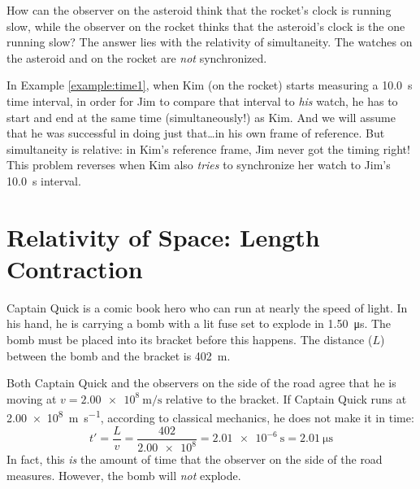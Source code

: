 How can the observer on the asteroid think that the rocket's clock is running
slow, while the observer on the rocket thinks that the asteroid's clock is
the one running slow? The answer lies with the relativity of simultaneity. The
watches on the asteroid and on the rocket are \emph{not} synchronized.

In Example \ref{example:time1}, when Kim (on the rocket) starts measuring a
\SI{10.0}{\second} time interval, in order for Jim to compare that interval to
\emph{his} watch, he has to start and end at the same time (simultaneously!) as
Kim. And we will assume that he was successful in doing just that\ldots in his
own frame of reference. But simultaneity is relative: in Kim's reference frame,
Jim never got the timing right! This problem reverses when Kim also
\emph{tries} to synchronize her watch to Jim's \SI{10.0}{\second} interval.


\section{Relativity of Space: Length Contraction}
Captain Quick is a comic book hero who can run at nearly the speed of light.
In his hand, he is carrying a bomb with a lit fuse set to explode in
\SI{1.50}{\micro\second}. The bomb must be placed into its bracket before
this happens. The distance ($L$) between the bomb and the bracket is
\SI{402}\metre.
%
%
%
%
\begin{figure}[ht]
  \centering
\end{figure}
Both Captain Quick and the observers on the side of the road agree that
he is moving at $v=\SI{2.00e8}{\metre\per\second}$ relative to the bracket.
%
%
%
%
If Captain Quick runs at \SI{2.00e8}{\metre\per\second}, according to
classical mechanics, he does not make it in time:
\begin{displaymath}
  t'=\frac Lv=\frac{402}{\num{2.00e8}}
  =\SI{2.01e-6}\second=\SI{2.01}{\micro\second}
\end{displaymath}
In fact, this \emph{is} the amount of time that the observer on the side of
the road measures. However, the bomb will \emph{not} explode.





